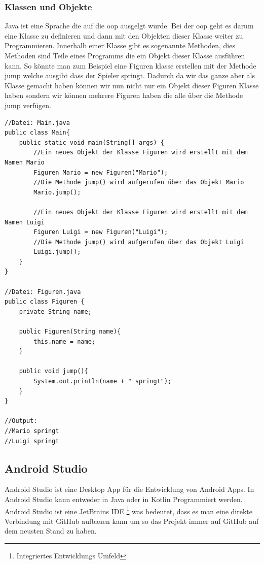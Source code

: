 \subsubsection{Klassen und Objekte}
Java ist eine Sprache die auf die \gls{oop} ausgelgt wurde. Bei der \gls{oop} geht es darum eine Klasse zu definieren und dann mit den Objekten dieser Klasse weiter zu Programmieren. Innerhalb einer Klasse gibt es sogenannte Methoden, dies Methoden sind Teile eines Programms die ein Objekt dieser Klasse ausführen kann. So könnte man zum Beispiel eine Figuren klasse erstellen mit der Methode jump welche ausgibt dass der Spieler springt. Dadurch da wir das ganze aber als Klasse gemacht haben können wir nun nicht nur ein Objekt dieser Figuren Klasse haben sondern wir können mehrere Figuren haben die alle über die Methode jump verfügen.
\begin{verbatim}
//Datei: Main.java
public class Main{
    public static void main(String[] args) {
        //Ein neues Objekt der Klasse Figuren wird erstellt mit dem Namen Mario
        Figuren Mario = new Figuren("Mario");
        //Die Methode jump() wird aufgerufen über das Objekt Mario
        Mario.jump();

        //Ein neues Objekt der Klasse Figuren wird erstellt mit dem Namen Luigi
        Figuren Luigi = new Figuren("Luigi");
        //Die Methode jump() wird aufgerufen über das Objekt Luigi
        Luigi.jump();
    }
}

//Datei: Figuren.java
public class Figuren {
    private String name;

    public Figuren(String name){
        this.name = name;
    }

    public void jump(){
        System.out.println(name + " springt");
    }
}

//Output:
//Mario springt
//Luigi springt
\end{verbatim}

\subsection{Android Studio}
Android Studio ist eine Desktop App für die Entwicklung von Android Apps. In Android Studio kann entweder in Java oder in Kotlin Programmiert werden. Android Studio ist eine JetBrains IDE \footnote{Integriertes Entwicklungs Umfeld} was bedeutet, dass es man eine direkte Verbindung mit GitHub aufbauen kann um so das Projekt immer auf GitHub auf dem neusten Stand zu haben\cite{freecodecamporg_android_2020}.

